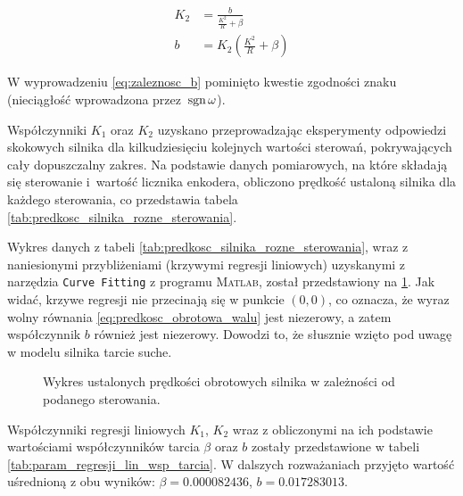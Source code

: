 \begin{align}
    K_2 &= \frac{b}{\frac{K^2}{R} + \beta} \nonumber \\
    b &= K_2 \left(\frac{K^2}{R} + \beta \right) \label{eq:zaleznosc_b}
\end{align}

W wyprowadzeniu \eqref{eq:zaleznosc_b} pominięto kwestie zgodności znaku (nieciągłość wprowadzona przez~$\operatorname{sgn} \omega$).

Współczynniki $K_1$ oraz $K_2$ uzyskano przeprowadzając eksperymenty odpowiedzi skokowych silnika dla kilkudziesięciu kolejnych wartości sterowań, pokrywających cały dopuszczalny zakres. Na podstawie danych pomiarowych, na które składają się sterowanie i~wartość licznika enkodera, obliczono prędkość ustaloną silnika dla każdego sterowania, co przedstawia tabela \ref{tab:predkosc_silnika_rozne_sterowania}.

Wykres danych z tabeli \ref{tab:predkosc_silnika_rozne_sterowania}, wraz z naniesionymi przybliżeniami (krzywymi regresji liniowych) uzyskanymi z narzędzia \texttt{Curve Fitting} z programu \textsc{Matlab}, został przedstawiony na \cref{fig:predkosci_obrotowe_silnika}. Jak widać, krzywe regresji nie przecinają się w punkcie $(0, 0)$, co oznacza, że wyraz wolny równania \eqref{eq:predkosc_obrotowa_walu} jest niezerowy, a zatem współczynnik $b$ również jest niezerowy. Dowodzi to, że słusznie wzięto pod uwagę w modelu silnika tarcie suche.

\begin{figure}[h]
    \centering
    
    \caption{Wykres ustalonych prędkości obrotowych silnika w zależności od podanego sterowania.}
    \label{fig:predkosci_obrotowe_silnika}
\end{figure}

Współczynniki regresji liniowych $K_1$, $K_2$ wraz z obliczonymi na ich podstawie wartościami współczynników tarcia $\beta$ oraz $b$ zostały przedstawione w tabeli \ref{tab:param_regresji_lin_wsp_tarcia}. W dalszych rozważaniach przyjęto wartość uśrednioną z obu wyników: $\beta = \num{0,000082436}$, $b = \num{0,017283013}$.

